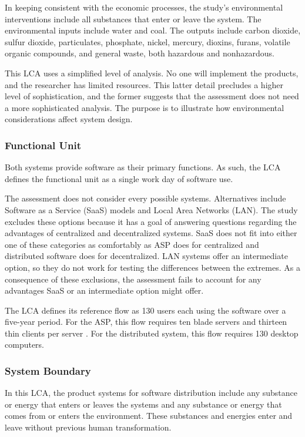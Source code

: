 \documentclass[final,journal,10pt,letterpaper,oneside,twocolumn,compsoc]%
{IEEEtran}
\begin{document}
In keeping consistent with the economic processes, the study's environmental
interventions
include all substances that enter or leave the system. The environmental inputs
include water and coal. The outputs include carbon dioxide, sulfur dioxide,
particulates, phosphate, nickel, mercury, dioxins, furans, volatile organic
compounds, and general waste, both hazardous and nonhazardous.

This LCA uses a simplified level of analysis. No one will implement the
products, and the researcher has limited resources. This latter detail precludes
a higher level of sophistication, and the former suggests that the
assessment does not need a more sophisticated analysis. The purpose is to
illustrate how environmental considerations affect system design.

\subsubsection{Functional Unit}
Both systems provide software as their primary functions.  As such, the LCA
defines the functional unit as a single work day of software use.

The assessment does not consider every possible systems. Alternatives include
Software as a Service (SaaS) models and Local Area Networks (LAN). The study
excludes
these options because it has a goal of answering questions regarding the
advantages of
centralized and decentralized systems. SaaS does not fit into either one of
these categories as comfortably as ASP does for centralized and distributed
software does for decentralized. LAN systems offer an intermediate option, so
they do not work for testing the differences between the extremes. As a
consequence
of these exclusions, the assessment fails to account for any advantages SaaS or
an intermediate option might offer. 

The LCA defines its reference flow as 130 users each using
the software over a five-year period. For the ASP,
this flow requires ten blade servers and thirteen thin clients per server
\cite{client}.
For the distributed system, this flow requires 130 desktop computers.

\subsubsection{System Boundary}
In this LCA, the product systems for software distribution
include any substance or energy that enters or
leaves the systems and any substance or energy that comes from or enters the
environment. These substances and energies enter and leave without previous
human transformation.
\end{document}
